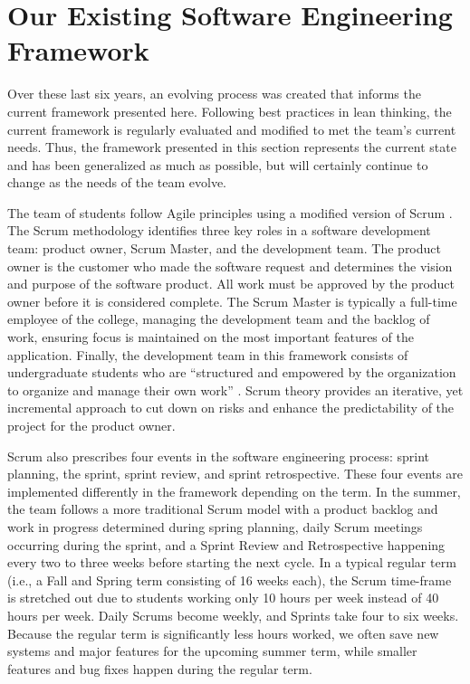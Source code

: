 \section{Our Existing Software Engineering Framework}

Over these last six years, an evolving process was created that informs the current framework presented here. Following best practices in lean thinking, the current framework is regularly evaluated and modified to met the team's current needs. Thus, the framework presented in this section represents the current state and has been generalized as much as possible, but will certainly continue to change as the needs of the team evolve.

The team of students follow Agile principles \cite{agilemanifesto} using a modified version of Scrum \cite{thescrumguide}. The Scrum methodology identifies three key roles in a software development team: product owner, Scrum Master, and the development team. The product owner is the customer who made the software request and determines the vision and purpose of the software product. All work must be approved by the product owner before it is considered complete. The Scrum Master is typically a full-time employee of the college, managing the development team and the backlog of work, ensuring focus is maintained on the most important features of the application. Finally, the development team in this framework consists of undergraduate students who are ``structured and empowered by the organization to organize and manage their own work'' \cite{thescrumguide}. Scrum theory provides an iterative, yet incremental approach to cut down on risks and enhance the predictability of the project for the product owner.

Scrum also prescribes four events in the software engineering process: sprint planning, the sprint, sprint review, and sprint retrospective. These four events are implemented differently in the framework depending on the term. In the summer, the team follows a more traditional Scrum model with a product backlog and work in progress determined during spring planning, daily Scrum meetings occurring during the sprint, and a Sprint Review and Retrospective happening every two to three weeks before starting the next cycle. In a typical regular term (i.e., a Fall and Spring term consisting of 16 weeks each), the Scrum time-frame is stretched out due to students working only 10 hours per week instead of 40 hours per week. Daily Scrums become weekly, and Sprints take four to six weeks. Because the regular term is significantly less hours worked, we often save new systems and major features for the upcoming summer term, while smaller features and bug fixes happen during the regular term.

